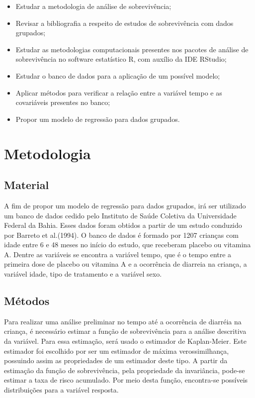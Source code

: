 \documentclass[a4paper,12pt]{article}
\begin{document}
\begin{itemize}
	
	\item Estudar a metodologia de análise de sobrevivência;
	\item Revisar a bibliografia a respeito de estudos de sobrevivência com dados grupados;	
	\item Estudar as metodologias computacionais presentes nos pacotes de análise de sobrevivência no software estatístico R, com auxílio da IDE RStudio;
	\item Estudar o banco de dados para a aplicação de um possível modelo;
	\item Aplicar métodos para verificar a relação entre a variável tempo e as covariáveis presentes no banco;
	\item Propor um modelo de regressão para dados grupados.
\end{itemize}

\vspace{1cm}
\newpage
\section{Metodologia}
\noindent

\subsection{Material}

A fim de propor um modelo de regressão para dados grupados, irá ser utilizado um banco de dados cedido pelo Instituto de Saúde Coletiva da Universidade Federal da Bahia. Esses dados foram obtidos a partir de um estudo conduzido por Barreto et al.(1994). O banco de dados é formado por 1207 crianças com idade entre 6 e 48 meses no início do estudo, que receberam placebo ou vitamina A. Dentre as variáveis se encontra a variável tempo, que é o tempo entre a primeira dose de placebo ou vitamina A e a ocorrência de diarreia na criança, a variável idade, tipo de tratamento e a variável sexo.

\subsection{Métodos}

Para realizar uma análise preliminar no tempo até a ocorrência de diarréia na criança, é necessário estimar a função de sobrevivência para a análise descritiva da variável. Para essa estimação, será usado o estimador de Kaplan-Meier. Este estimador foi escolhido por ser um estimador de máxima verossimilhança, possuindo assim as propriedades de um estimador deste tipo. A partir da estimação da função de sobrevivência, pela propriedade da invariância, pode-se estimar a taxa de risco acumulado. Por meio desta função, encontra-se possíveis distribuições para a variável resposta.
\end{document}
